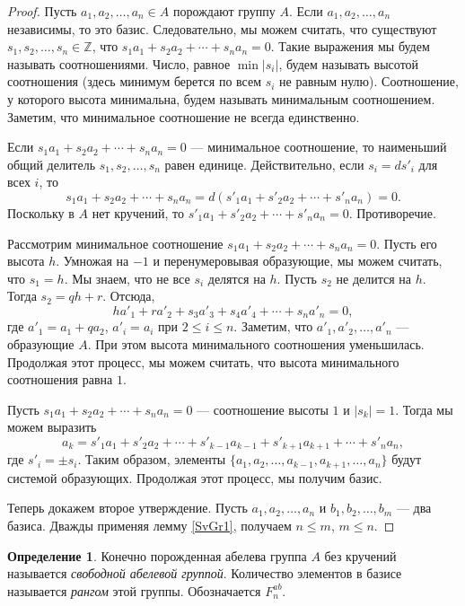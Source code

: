 \documentclass[12pt, titlepage, oneside]{amsbook}
\newcommand{\ZZ}{\mathbb{Z}}
\theoremstyle{definition}
\newtheorem{definition}[theorem]{Определение}
\theoremstyle{remark}
\begin{document}
\begin{proof}
	Пусть $a_1,a_2,\ldots, a_n\in A$ порождают группу $A$. Если $a_1,a_2,\ldots, a_n$ независимы, то это базис. Следовательно, мы можем считать, что существуют $s_1,s_2,\ldots, s_n\in\ZZ$, что $s_1a_1+s_2a_2+\cdots+s_na_n=0$. Такие выражения мы будем называть соотношениями. Число, равное $\min|s_i|$, будем называть высотой соотношения (здесь минимум берется по всем $s_i$ не равным нулю). Соотношение, у которого высота минимальна, будем называть минимальным соотношением. Заметим, что минимальное соотношение не всегда единственно.
	
	Если $s_1a_1+s_2a_2+\cdots+s_na_n=0$ --- минимальное соотношение, то наименьший общий делитель $s_1,s_2,\ldots, s_n$ равен единице. Действительно, если $s_i=ds'_i$ для всех $i$, то $$s_1a_1+s_2a_2+\cdots+s_na_n=d(s'_1a_1+s'_2a_2+\cdots+s'_na_n)=0.$$ Поскольку в $A$ нет кручений, то $s'_1a_1+s'_2a_2+\cdots+s'_na_n=0.$ Противоречие.
	
	Рассмотрим минимальное соотношение $s_1a_1+s_2a_2+\cdots+s_na_n=0$. Пусть его высота $h$. Умножая на $-1$ и перенумеровывая образующие, мы можем считать, что $s_1=h$. Мы знаем, что не все $s_i$ делятся на $h$. Пусть $s_2$ не делится на $h$. Тогда $s_2=qh+r$. Отсюда, $$ha'_1+ra'_2+s_3a'_3+s_4a'_4+\cdots+s_na'_n=0,$$ где $a'_1=a_1+qa_2$, $a'_i=a_i$ при $2\leq i\leq n$. Заметим, что $a'_1,a'_2,\ldots, a'_n$ --- образующие $A$. При этом высота минимального соотношения уменьшилась. Продолжая этот процесс, мы можем считать, что высота минимального соотношения равна $1$.
	
	Пусть $s_1a_1+s_2a_2+\cdots+s_na_n=0$ --- соотношение высоты $1$ и $|s_k|=1$. Тогда мы можем выразить $$a_k=s'_1a_1+s'_2a_2+\cdots+s'_{k-1}a_{k-1}+s'_{k+1}a_{k+1}+\cdots+s'_{n}a_{n},$$ где $s'_i=\pm s_i$. Таким образом, элементы $\{a_1,a_2,\ldots,a_{k-1},a_{k+1},\ldots,a_n\}$ будут системой образующих. Продолжая этот процесс, мы получим базис.
	
	Теперь докажем второе утверждение. Пусть $a_1,a_2,\ldots, a_n$ и $b_1,b_2,\ldots, b_m$ --- два базиса. Дважды применяя лемму \ref{SvGr1}, получаем $n\leq m$, $m\leq n$.
\end{proof}

\begin{definition}
	Конечно порожденная абелева группа $A$ без кручений называется \emph{свободной абелевой группой}. Количество элементов в базисе называется \emph{рангом} этой группы. Обозначается $F_n^{ab}$.
\end{definition}
\end{document}
